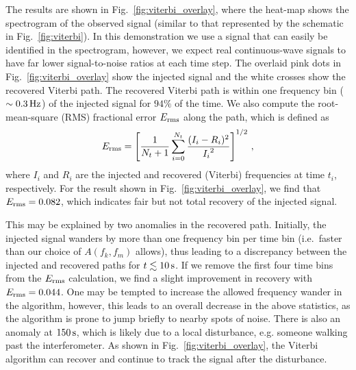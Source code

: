\documentclass[paper-main.tex]{subfiles}
\begin{document}
The results are shown in Fig.~\ref{fig:viterbi_overlay}, where the heat-map shows the spectrogram of the observed signal (similar to that represented by the schematic in Fig.~\ref{fig:viterbi}). 
In this demonstration we use a signal that can easily be identified in the spectrogram, however, we expect real continuous-wave signals to have far lower signal-to-noise ratios at each time step. 
The overlaid pink dots in Fig.~\ref{fig:viterbi_overlay} show the injected signal and the white crosses show the recovered Viterbi path.
The recovered Viterbi path is within one frequency bin ($\sim 0.3\,{\rm Hz}$) of the injected signal for $94\%$ of the time. We also compute the root-mean-square (RMS) fractional error $E_{\rm rms}$ along the path, which is defined as 
\begin{equation}
E_{\rm rms} = \left[ \frac{1}{N_t+1} \sum_{i=0}^{N_t} \frac{(I_i - R_i)^2}{{I_i}^2} \right] ^{1/2}\,,
\end{equation}
where $I_i$ and $R_i$ are the injected and recovered (Viterbi) frequencies at time $t_i$, respectively. 
For the result shown in Fig.~\ref{fig:viterbi_overlay}, we find that $E_{\rm rms} = 0.082$, which indicates fair but not total recovery of the injected signal.



This may be explained by two anomalies in the recovered path. Initially, the injected signal wanders by more than one frequency bin per time bin (i.e.\ faster than our choice of $A(f_k,f_m)$ allows), thus leading to a discrepancy between the injected and recovered paths for $t\lesssim 10\,{\rm s}$. 
If we remove the first four time bins from the $E_{\rm rms}$ calculation, we find a slight improvement in recovery with $E_{\rm rms} = 0.044$.
One may be tempted to increase the allowed frequency wander in the algorithm, however, this leads to an overall decrease in the above statistics, as the algorithm is prone to jump briefly to nearby spots of noise. 
There is also an anomaly at $150\,{\rm s}$, which is likely due to a local disturbance, e.g. someone walking past the interferometer. 
As shown in Fig.~\ref{fig:viterbi_overlay}, the Viterbi algorithm can recover and continue to track the signal after the disturbance. 
\end{document}
